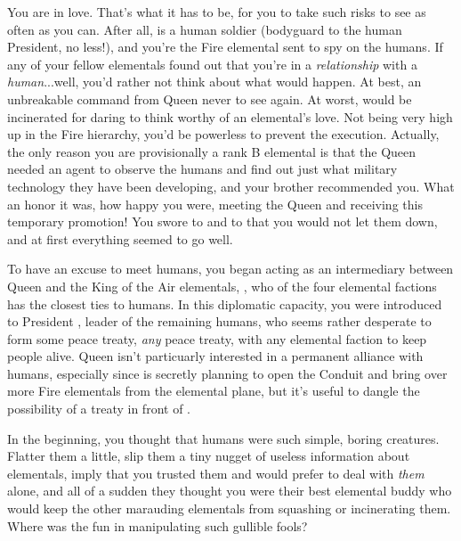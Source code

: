 \documentclass[char]{elementals}
\begin{document}
\name{\cJuliet{}}

You are in love.  That's what it has to be, for you to take such risks to see \cRomeo{\intro} as often as you can.  After all, \cRomeo{\they} is a human soldier (bodyguard to the human President, no less!), and you're the Fire elemental sent to spy on the humans.  If any of your fellow elementals found out that you're in a \emph{relationship} with a \emph{human}...well, you'd rather not think about what would happen.  At best, an unbreakable command from Queen \cQueen{\intro} never to see \cRomeo{} again.  At worst, \cRomeo{\they} would be incinerated for daring to think \cRomeo{\themself} worthy of an elemental's love.  Not being very high up in the Fire hierarchy, you'd be powerless to prevent the execution.  Actually, the only reason you are provisionally a rank B elemental is that the Queen needed an agent to observe the humans and find out just what military technology they have been developing, and your brother \cPyro{\intro} recommended you.  What an honor it was, how happy you were, meeting the Queen and receiving this temporary promotion!  You swore to \cQueen{\them} and to \cPyro{} that you would not let them down, and at first everything seemed to go well.

To have an excuse to meet humans, you began acting as an intermediary between Queen \cQueen{} and the King of the Air elementals, \cKing{\intro}, who of the four elemental factions has the closest ties to humans.  In this diplomatic capacity, you were introduced to President \cLeader{\intro}, leader of the remaining humans, who seems rather desperate to form some peace treaty, \emph{any} peace treaty, with any elemental faction to keep \cLeader{\their} people alive.  Queen \cQueen{} isn't particuarly interested in a permanent alliance with humans, especially since \cQueen{\they} is secretly planning to open the Conduit and bring over more Fire elementals from the elemental plane, but it's useful to dangle the possibility of a treaty in front of \cLeader{\them}.  

In the beginning, you thought that humans were such simple, boring creatures.  Flatter them a little, slip them a tiny nugget of useless information about elementals, imply that you trusted them and would prefer to deal with \emph{them} alone, and all of a sudden they thought you were their best elemental buddy who would keep the other marauding elementals from squashing or incinerating them.  Where was the fun in manipulating such gullible fools?
\end{document}
